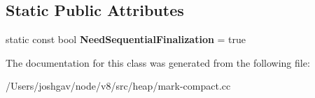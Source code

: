 \subsection*{Static Public Attributes}
\begin{DoxyCompactItemize}
\item 
static const bool {\bfseries Need\+Sequential\+Finalization} = true\hypertarget{classv8_1_1internal_1_1_evacuation_job_traits_a592f9f187001094ca648177242f3d2ef}{}\label{classv8_1_1internal_1_1_evacuation_job_traits_a592f9f187001094ca648177242f3d2ef}

\end{DoxyCompactItemize}


The documentation for this class was generated from the following file\+:\begin{DoxyCompactItemize}
\item 
/\+Users/joshgav/node/v8/src/heap/mark-\/compact.\+cc\end{DoxyCompactItemize}
